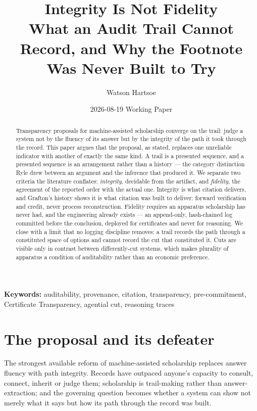 \documentclass[11pt,a4paper]{article}
\title{\textbf{Integrity Is Not Fidelity}\\[.35em]\large What an Audit Trail Cannot Record, and Why the Footnote Was Never Built to Try}
\author{Watson Hartsoe}
\date{2026-08-19 \quad\textemdash\quad Working Paper}
\begin{document}
\maketitle
\begin{abstract}\noindent Transparency proposals for machine-assisted scholarship converge on the trail: judge a system not by the fluency of its answer but by the integrity of the path it took through the record. This paper argues that the proposal, as stated, replaces one unreliable indicator with another of exactly the same kind. A trail is a presented sequence, and a presented sequence is an arrangement rather than a history --- the category distinction Ryle drew between an argument and the inference that produced it. We separate two criteria the literature conflates: \emph{integrity}, decidable from the artifact, and \emph{fidelity}, the agreement of the reported order with the actual one. Integrity is what citation delivers, and Grafton's history shows it is what citation was built to deliver: forward verification and credit, never process reconstruction. Fidelity requires an apparatus scholarship has never had, and the engineering already exists --- an append-only, hash-chained log committed before the conclusion, deployed for certificates and never for reasoning. We close with a limit that no logging discipline removes: a trail records the path through a constituted space of options and cannot record the cut that constituted it. Cuts are visible only in contrast between differently-cut systems, which makes plurality of apparatus a condition of auditability rather than an economic preference.\end{abstract}
\vspace{-.5em}\noindent\textbf{Keywords:} auditability, provenance, citation, transparency, pre-commitment, Certificate Transparency, agential cut, reasoning traces\par\vspace{1em}
\section{The proposal and its defeater}
The strongest available reform of machine-assisted scholarship replaces answer fluency with path integrity. Records have outpaced anyone's capacity to consult, connect, inherit or judge them; scholarship is trail-making rather than answer-extraction; and the governing question becomes whether a system can show not merely what it says but how its path through the record was built.
\end{document}
